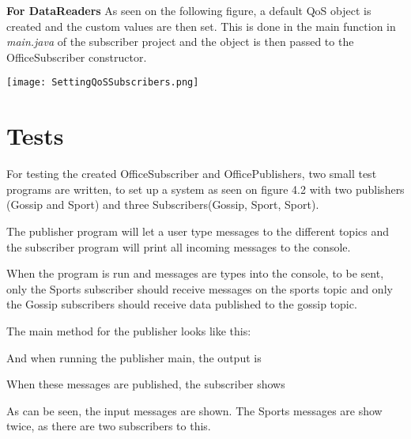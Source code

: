 \textbf{For DataReaders}
As seen on the following figure, a default QoS object is created and the custom values are then set. This is done in the main function in \textit{main.java} of the subscriber project and the object is then passed to the OfficeSubscriber constructor.
\begin{center}
	\texttt{[image: SettingQoSSubscribers.png]}
\end{center}




\section{Tests}
For testing the created OfficeSubscriber and OfficePublishers, two small test programs are written, to set up a system as seen on figure 4.2 with two publishers (Gossip and Sport) and three Subscribers(Gossip, Sport, Sport). 

The publisher program will let a user type messages to the different topics and the subscriber program will print all incoming messages to the console.

When the program is run and messages are types into the console, to be sent, only the Sports subscriber should receive messages on the sports topic and only the Gossip subscribers should receive data published to the gossip topic. 

The main method for the publisher looks like this:

\begin{center}
\end{center}

And when running the publisher main, the output is 

\begin{center}
\end{center}

When these messages are published, the subscriber shows 

\begin{center}
\end{center}

As can be seen, the input messages are shown. The Sports messages are show twice, as there are two subscribers to this.
